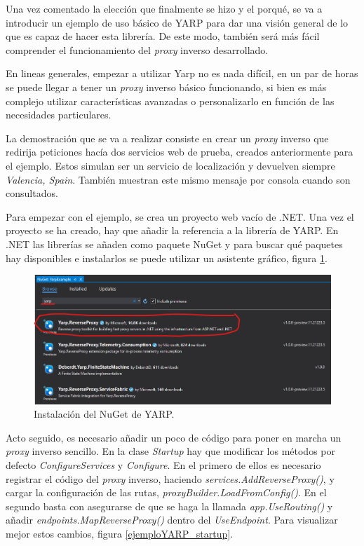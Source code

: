 \documentclass[11pt,spanish,listoffigures]{tfgetsinf}
\begin{document}
Una vez comentado la elección que finalmente se hizo y el porqué, se va a introducir un ejemplo de uso básico de YARP para dar una visión general de lo que es capaz de hacer esta librería. De este modo, también será más fácil comprender el funcionamiento del \emph{proxy} inverso desarrollado.

En lineas generales, empezar a utilizar Yarp no es nada difícil, en un par de horas se puede llegar a tener un \emph{proxy} inverso básico funcionando, si bien es más complejo utilizar características avanzadas o personalizarlo en función de las necesidades particulares.

La demostración que se va a realizar consiste en crear un \emph{proxy} inverso que redirija peticiones hacía dos servicios web de prueba, creados anteriormente para el ejemplo. Estos simulan ser un servicio de localización y devuelven siempre \emph{Valencia, Spain}. También muestran este mismo mensaje por consola cuando son consultados.

Para empezar con el ejemplo, se crea un proyecto web vacío de .NET. Una vez el proyecto se ha creado, hay que añadir la referencia a la librería de YARP. En .NET las librerías se añaden como paquete NuGet y para buscar qué paquetes hay disponibles e instalarlos se puede utilizar un asistente gráfico, figura \ref{ejemploYARP_instalacionNuGet}.

\begin{figure}[ht]
\centering
\includegraphics[width=1\textwidth]{imagenes/ejemploYARP/instalacionNuGet}
\caption{Instalación del NuGet de YARP.}
	\label{ejemploYARP_instalacionNuGet}
\end{figure}

Acto seguido, es necesario añadir un poco de código para poner en marcha un \emph{proxy} inverso sencillo. En la clase \emph{Startup} hay que modificar los métodos por defecto \emph{ConfigureServices} y \emph{Configure}. En el primero de ellos es necesario registrar el código del \emph{proxy} inverso, haciendo \emph{services.AddReverseProxy()}, y cargar la configuración de las rutas, \emph{proxyBuilder.LoadFromConfig()}. En el segundo basta con asegurarse de que se haga la llamada \emph{app.UseRouting()} y añadir  \emph{endpoints.MapReverseProxy()} dentro del \emph{UseEndpoint}. Para visualizar mejor estos cambios, figura \ref{ejemploYARP_startup}.
\end{document}
